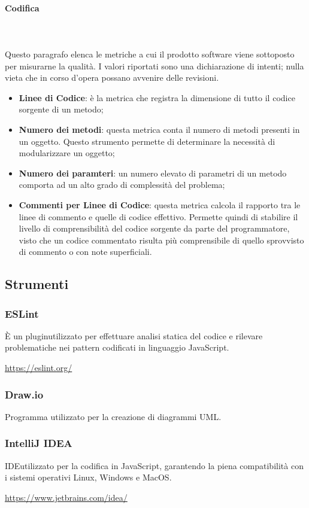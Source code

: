 			\paragraph{Codifica} \mbox{} \\ \mbox{} \\
			Questo paragrafo elenca le metriche a cui il prodotto software viene sottoposto per misurarne la qualità.
			I valori riportati sono una dichiarazione di intenti; nulla vieta che in corso d'opera possano avvenire delle revisioni.
			\begin{itemize}
			\item \textbf{Linee di Codice}: è la metrica che registra la dimensione di tutto il codice sorgente di un metodo;
			\item \textbf{Numero dei metodi}: questa metrica conta il numero di metodi presenti in un oggetto. Questo strumento permette di determinare la necessità di modularizzare un oggetto;
			\item \textbf{Numero dei paramteri}: un numero elevato di parametri di un metodo comporta ad un alto grado di complessità del problema;
			\item \textbf{Commenti per Linee di Codice}: questa metrica calcola il rapporto tra le linee di commento e quelle di codice effettivo. Permette quindi di stabilire il livello di comprensibilità del codice sorgente da parte del programmatore, visto che un codice commentato risulta più comprensibile di quello sprovvisto di commento o con note superficiali.
			\end{itemize}
	\subsection{Strumenti}
	\subsubsection{ESLint}
	È un plugin\glo utilizzato per effettuare analisi statica del codice e rilevare problematiche nei pattern codificati in linguaggio JavaScript\glo. \\
	\centerline{\url{https://eslint.org/}}
	\subsubsection{Draw.io}
	Programma utilizzato per la creazione di diagrammi UML.
	\subsubsection{IntelliJ IDEA}
	IDE\glo utilizzato per la codifica in JavaScript, garantendo la piena compatibilità con i sistemi operativi Linux, Windows e MacOS.\\		
	\centerline{\url{https://www.jetbrains.com/idea/}}
